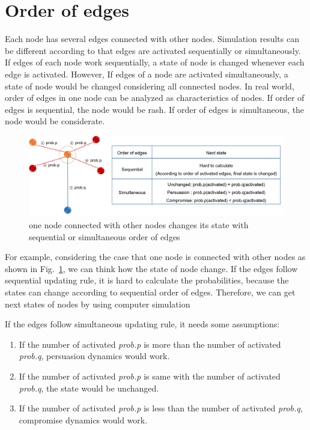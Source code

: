 \section{Order of edges}
Each node has several edges connected with other nodes. Simulation results can be different according to that edges are activated sequentially or simultaneously. If edges of each node work sequentially, a state of node is changed whenever each edge is activated. However, If edges of a node are activated simultaneously, a state of node would be changed considering all connected nodes. In real world, order of edges in one node can be analyzed as characteristics of nodes. If order of edges is sequential, the node would be rash. If order of edges is simultaneous, the node would be considerate. 
\begin{figure}[!htb]
	\centering
	\includegraphics[width=\hsize]{figure/chap4_edgeorder_explanation.png}
	\caption{one node connected with other nodes changes its state with sequential or simultaneous order of edges}
	\label{edgeorder_explanation}
\end{figure}  
For example, considering the case that one node is connected with other nodes as shown in Fig.~\ref{edgeorder_explanation}, we can think how the state of node change. 
If the edges follow sequential updating rule, it is hard to calculate the probabilities, because the states can change according to sequential order of edges. Therefore, we can get next states of nodes by using computer simulation 

If the edges follow simultaneous updating rule, it needs some assumptions: 
\begin{enumerate}
	\item If the number of activated \textit{prob.p} is more than the number of activated \textit{prob.q}, persuasion dynamics would work. 
	\item If the number of activated \textit{prob.p} is same with the number of activated \textit{prob.q}, the state would be unchanged.
	\item If the number of activated \textit{prob.p} is less than the number of activated \textit{prob.q}, compromise dynamics would work.
\end{enumerate}


